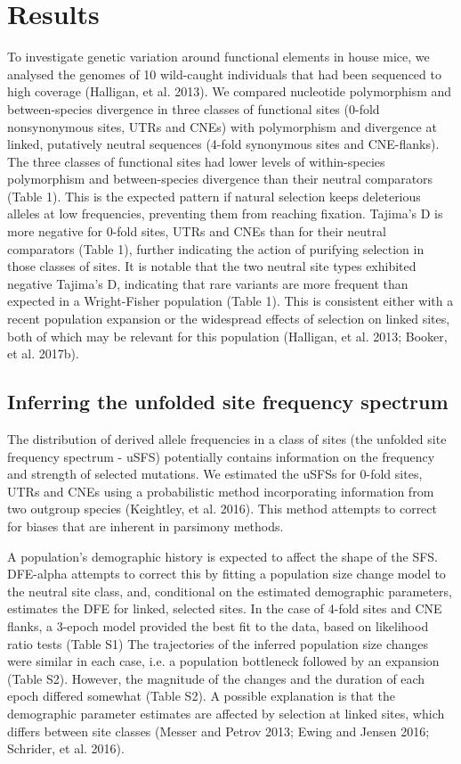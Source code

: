 \section{Results}

To investigate genetic variation around functional elements in house mice, we analysed the genomes of 10 wild-caught individuals that had been sequenced to high coverage (Halligan, et al. 2013). We compared nucleotide polymorphism and between-species divergence in three classes of functional sites (0-fold nonsynonymous sites, UTRs and CNEs) with polymorphism and divergence at linked, putatively neutral sequences (4-fold synonymous sites and CNE-flanks). The three classes of functional sites had lower levels of within-species polymorphism and between-species divergence than their neutral comparators (Table 1). This is the expected pattern if natural selection keeps deleterious alleles at low frequencies, preventing them from reaching fixation. Tajima’s D is more negative for 0-fold sites, UTRs and CNEs than for their neutral comparators (Table 1), further indicating the action of purifying selection in those classes of sites. It is notable that the two neutral site types exhibited negative Tajima’s D, indicating that rare variants are more frequent than expected in a Wright-Fisher population (Table 1). This is consistent either with a recent population expansion or the widespread effects of selection on linked sites, both of which may be relevant for this population (Halligan, et al. 2013; Booker, et al. 2017b). 

\subsection{Inferring the unfolded site frequency spectrum}

The distribution of derived allele frequencies in a class of sites (the unfolded site frequency spectrum - uSFS) potentially contains information on the frequency and strength of selected mutations. We estimated the uSFSs for 0-fold sites, UTRs and CNEs using a probabilistic method incorporating information from two outgroup species (Keightley, et al. 2016). This method attempts to correct for biases that are inherent in parsimony methods. 

A population’s demographic history is expected to affect the shape of the SFS. DFE-alpha attempts to correct this by fitting a population size change model to the neutral site class, and, conditional on the estimated demographic parameters, estimates the DFE for linked, selected sites. In the case of 4-fold sites and CNE flanks, a 3-epoch model provided the best fit to the data, based on likelihood ratio tests (Table S1) The trajectories of the inferred population size changes were similar in each case, i.e. a population bottleneck followed by an expansion (Table S2). However, the magnitude of the changes and the duration of each epoch differed somewhat (Table S2). A possible explanation is that the demographic parameter estimates are affected by selection at linked sites, which differs between site classes (Messer and Petrov 2013; Ewing and Jensen 2016; Schrider, et al. 2016).


